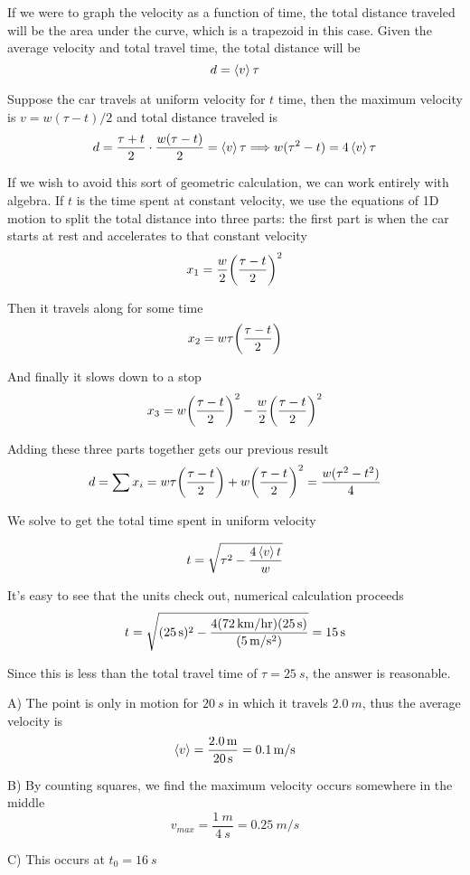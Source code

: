 \begin{exercise}
If we were to graph the velocity as a function of time, the total distance traveled will be the area under the curve, which is a trapezoid in this case. Given the average velocity and total travel time, the total distance will be
\[ d = \left\langle v \right\rangle \tau \]

Suppose the car travels at uniform velocity for $t$ time, then the maximum velocity is $v = w(\tau - t) / 2$ and total distance traveled is
\[ d = \frac{\tau + t}{2} \cdot \frac{w(\tau - t)}{2} = \left\langle v \right\rangle \tau \Longrightarrow w (\tau^2 - t) = 4\left\langle v \right\rangle \tau \]

If we wish to avoid this sort of geometric calculation, we can work entirely with algebra. If $t$ is the time spent at constant velocity, we use the equations of 1D motion to split the total distance into three parts: the first part is when the car starts at rest and accelerates to that constant velocity
\[ x_1 = \frac{w}{2}\qty(\frac{\tau - t}{2})^2 \]

Then it travels along for some time
\[ x_2 = w\tau \qty(\frac{\tau - t}{2})\]

And finally it slows down to a stop
\[ x_3 = w\qty(\frac{\tau - t}{2})^2 - \frac{w}{2}\qty(\frac{\tau - t}{2})^2 \]

Adding these three parts together gets our previous result
\[ d = \sum x_i = w\tau \qty(\frac{\tau - t}{2}) + w\qty(\frac{\tau - t}{2})^2 = \frac{w(\tau^2 - t^2)}{4}\]

We solve to get the total time spent in uniform velocity
\begin{answer}
	\[ t = \sqrt{\tau^2 - \frac{4\left\langle v \right\rangle t}{w}} \]
\end{answer}

It's easy to see that the units check out, numerical calculation proceeds
\[ t = \sqrt{(\SI{25}{s})^2 - \frac{4 (\SI{72}{km/hr}) (\SI{25}{s})}{\qty(\SI{5}{m/s^2})}} = \SI{15}{s} \]

Since this is less than the total travel time of $\tau = \SI{25}{s}$, the answer is reasonable.
\end{exercise}


\begin{exercise}
A) The point is only in motion for $\SI{20}{s}$ in which it travels $\SI{2.0}{m}$, thus the average velocity is 
\[ \left\langle v \right\rangle = \frac{\SI{2.0}{m}}{\SI{20}{s}} = \SI{0.1}{m/s} \]

B) By counting squares, we find the maximum velocity occurs somewhere in the middle
\[ v_{max} = \frac{\SI{1}{m}}{\SI{4}{s}} = \SI{0.25}{m/s} \]

C) This occurs at $t_0 = \SI{16}{s}$
\end{exercise}


